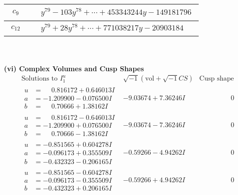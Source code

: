 \documentclass[1p]{elsarticle_modified}
\theoremstyle{definition}
\newcommand{\I}{\sqrt{-1}}
\begin{document}
\begin{tabular}{m{50pt}|m{274pt}}
\hline $$\begin{aligned}c_{9}\end{aligned}$$&$\begin{aligned}
&y^{79}-103 y^{78}+\cdots+453343244 y-149181796
\end{aligned}$\\
\hline $$\begin{aligned}c_{12}\end{aligned}$$&$\begin{aligned}
&y^{79}+28 y^{78}+\cdots+771038217 y-20903184
\end{aligned}$\\
\hline
\end{tabular}\\~\\
\newpage\flushleft \textbf{(vi) Complex Volumes and Cusp Shapes}
$$\begin{array}{c|c|c}  
\text{Solutions to }I^u_{1}& \I (\text{vol} + \sqrt{-1}CS) & \text{Cusp shape}\\
 \hline 
\begin{aligned}
u &= \phantom{-}0.816172 + 0.646013 I \\
a &= -1.209900 - 0.076500 I \\
b &= \phantom{-}0.70666 + 1.38162 I\end{aligned}
 & -9.03674 + 7.36246 I & \phantom{-0.000000 } 0 \\ \hline\begin{aligned}
u &= \phantom{-}0.816172 - 0.646013 I \\
a &= -1.209900 + 0.076500 I \\
b &= \phantom{-}0.70666 - 1.38162 I\end{aligned}
 & -9.03674 - 7.36246 I & \phantom{-0.000000 } 0 \\ \hline\begin{aligned}
u &= -0.851565 + 0.604278 I \\
a &= -0.096173 + 0.355509 I \\
b &= -0.432323 - 0.206165 I\end{aligned}
 & -0.59266 - 4.94262 I & \phantom{-0.000000 } 0 \\ \hline\begin{aligned}
u &= -0.851565 - 0.604278 I \\
a &= -0.096173 - 0.355509 I \\
b &= -0.432323 + 0.206165 I\end{aligned}
 & -0.59266 + 4.94262 I & \phantom{-0.000000 } 0 \\ \hline\begin{aligned}

\end{aligned}
\end{array}$$
\end{document}
